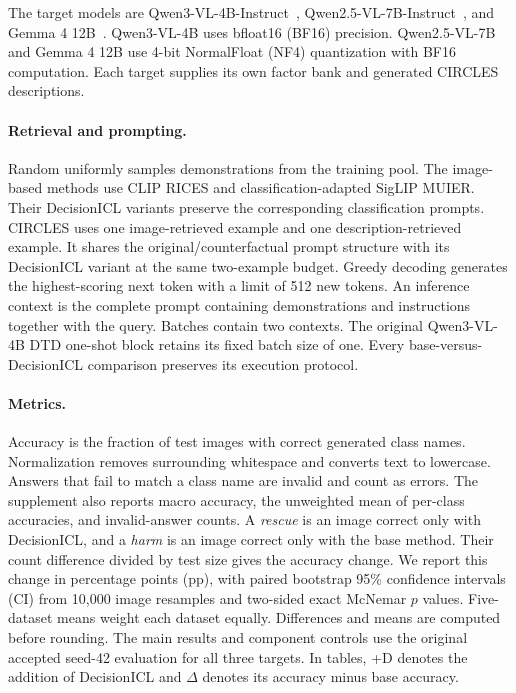 \documentclass[10pt,twocolumn,letterpaper]{article}
\newcommand{\method}{DecisionICL\xspace}
\begin{document}
The target models are Qwen3-VL-4B-Instruct~\cite{qwen3}, Qwen2.5-VL-7B-Instruct~\cite{qwen25}, and Gemma 4 12B~\cite{gemma4}. Qwen3-VL-4B uses bfloat16 (BF16) precision. Qwen2.5-VL-7B and Gemma 4 12B use 4-bit NormalFloat (NF4) quantization with BF16 computation. Each target supplies its own factor bank and generated CIRCLES descriptions.

\paragraph{Retrieval and prompting.}
Random uniformly samples demonstrations from the training pool. The image-based methods use CLIP RICES and classification-adapted SigLIP MUIER. Their \method variants preserve the corresponding classification prompts. CIRCLES uses one image-retrieved example and one description-retrieved example. It shares the original/counterfactual prompt structure with its \method variant at the same two-example budget. Greedy decoding generates the highest-scoring next token with a limit of 512 new tokens. An inference context is the complete prompt containing demonstrations and instructions together with the query. Batches contain two contexts. The original Qwen3-VL-4B DTD one-shot block retains its fixed batch size of one. Every base-versus-\method comparison preserves its execution protocol.

\paragraph{Metrics.}
Accuracy is the fraction of test images with correct generated class names. Normalization removes surrounding whitespace and converts text to lowercase. Answers that fail to match a class name are invalid and count as errors. The supplement also reports macro accuracy, the unweighted mean of per-class accuracies, and invalid-answer counts. A \emph{rescue} is an image correct only with \method, and a \emph{harm} is an image correct only with the base method. Their count difference divided by test size gives the accuracy change. We report this change in percentage points (pp), with paired bootstrap 95\% confidence intervals (CI) from 10,000 image resamples and two-sided exact McNemar $p$ values. Five-dataset means weight each dataset equally. Differences and means are computed before rounding. The main results and component controls use the original accepted seed-42 evaluation for all three targets. In tables, +D denotes the addition of \method and $\Delta$ denotes its accuracy minus base accuracy.
\end{document}
